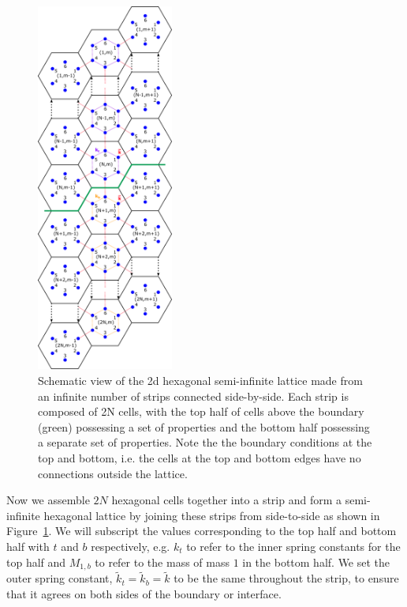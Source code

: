 \begin{figure}[!h]
\centering
\includegraphics[width=0.4\textwidth]{imgs/hexstripmodel.png}
\caption{\label{fig:hexstripmodel} Schematic view of the 2d hexagonal
  semi-infinite lattice made from an infinite number of strips connected
  side-by-side. Each strip is composed of 2N cells, with the top half of cells
  above the boundary (green) possessing a set of properties and the bottom half
  possessing a separate set of properties. Note the the boundary conditions at
  the top and bottom, i.e. the cells at the top and bottom edges have no
  connections outside the lattice.}
\end{figure}

Now we assemble $2N$ hexagonal cells together into a strip and form a
semi-infinite hexagonal lattice by joining these strips from side-to-side as
shown in Figure~\ref{fig:hexstripmodel}. We will subscript the values
corresponding to the top half and bottom half with $t$ and $b$ respectively,
e.g. $k_t$ to refer to the inner spring constants for the top half and
$M_{1,b}$ to refer to the mass of mass $1$ in the bottom half. We set the outer
spring constant, $\tilde{k}_t=\tilde{k}_b=\tilde{k}$ to be the same throughout
the strip, to ensure that it agrees on both sides of the boundary or interface.

